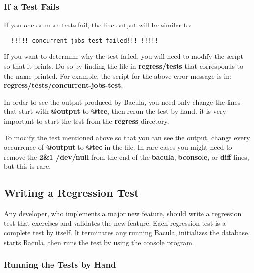 \subsubsection*{If a Test Fails}

If you one or more tests fail, the line output will be similar to: 

\footnotesize
\begin{verbatim}
  !!!!! concurrent-jobs-test failed!!! !!!!!
\end{verbatim}
\normalsize

If you want to determine why the test failed, you will need to modify the
script so that it prints. Do so by finding the file in {\bf regress/tests}
that corresponds to the name printed. For example, the script for the above
error message is in: {\bf regress/tests/concurrent-jobs-test}. 

In order to see the output produced by Bacula, you need only change the lines
that start with {\bf @output} to {\bf @tee}, then rerun the test by hand. it
is very important to start the test from the {\bf regress} directory. 

To modify the test mentioned above so that you can see the output, change
every occurrence of {\bf @output} to {\bf @tee} in the file. In rare cases you
might need to remove the {\bf 2\gt{}\&1 \gt{}/dev/null} from the end of the
{\bf bacula}, {\bf bconsole}, or {\bf diff} lines, but this is rare. 

\subsection*{Writing a Regression Test}

Any developer, who implements a major new feature, should write a regression
test that exercises and validates the new feature. Each regression test is a
complete test by itself. It terminates any running Bacula, initializes the
database, starts Bacula, then runs the test by using the console program. 

\subsubsection*{Running the Tests by Hand}

